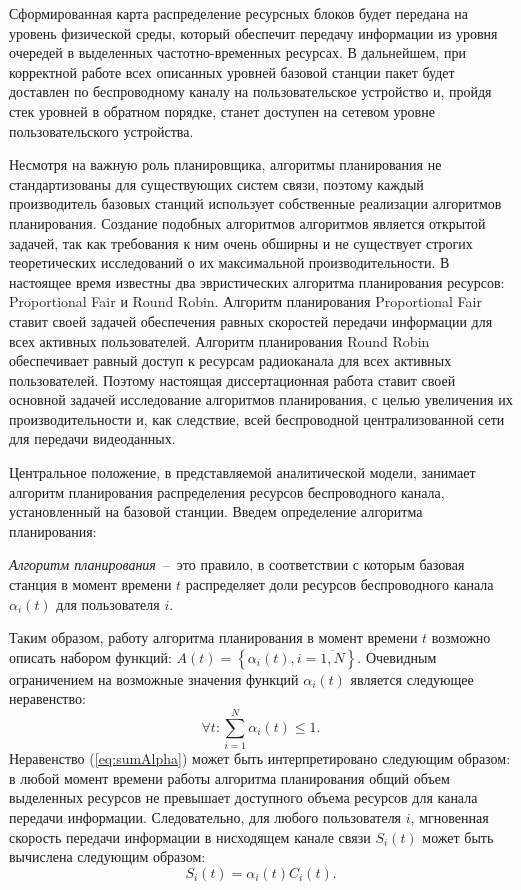Сформированная карта распределение ресурсных блоков будет передана на уровень физической среды, который обеспечит передачу информации из уровня очередей в выделенных частотно-временных ресурсах. В дальнейшем, при корректной работе всех описанных уровней базовой станции пакет будет доставлен по беспроводному каналу на пользовательское устройство и, пройдя стек уровней в обратном порядке, станет доступен на сетевом уровне пользовательского устройства.

Несмотря на важную роль планировщика, алгоритмы планирования не стандартизованы для существующих систем связи, поэтому каждый производитель базовых станций использует собственные реализации алгоритмов планирования. Создание подобных алгоритмов алгоритмов является открытой задачей, так как требования к ним очень обширны и не существует строгих теоретических исследований о их максимальной производительности. В настоящее время известны два эвристических алгоритма планирования ресурсов: Proportional Fair и Round Robin. Алгоритм планирования Proportional Fair ставит своей задачей обеспечения равных скоростей передачи информации для всех активных пользователей. Алгоритм планирования Round Robin обеспечивает равный доступ к ресурсам радиоканала для всех активных пользователей. Поэтому настоящая диссертационная работа ставит своей основной задачей исследование алгоритмов планирования, с целью увеличения их производительности и, как следствие, всей беспроводной централизованной сети для передачи видеоданных.

Центральное положение, в представляемой аналитической модели, занимает алгоритм планирования распределения ресурсов беспроводного канала, установленный на базовой станции. Введем определение алгоритма планирования:

\begin{definition}
\label{def:SchedulingAlg}
    \emph{Алгоритм планирования}~--~это правило, в соответствии с которым базовая станция в момент времени $t$ распределяет доли ресурсов беспроводного канала $\alpha_i(t)$ для пользователя $i$.
\end{definition}

Таким образом, работу алгоритма планирования в момент времени $t$ возможно описать набором функций: ${A}(t) = \left\{\alpha_{i}(t), i = \overline{1,N}\right\}$. Очевидным ограничением на возможные значения функций $\alpha_i(t)$ является следующее неравенство:
\begin{equation}
\forall t: \sum\limits_{i=1}^{N}\alpha_{i}(t) \leq 1.
\label{eq:sumAlpha}
\end{equation}
Неравенство (\ref{eq:sumAlpha}) может быть интерпретировано следующим образом: в любой момент времени работы алгоритма планирования общий объем выделенных ресурсов не превышает доступного объема ресурсов для канала передачи информации. Следовательно, для любого пользователя $i$, мгновенная скорость передачи информации в нисходящем канале связи $S_i(t)$ может быть вычислена следующим образом:
\begin{equation}
S_i(t) = \alpha_i(t) C_i(t).
\label{eq:MomentRate}
\end{equation}


